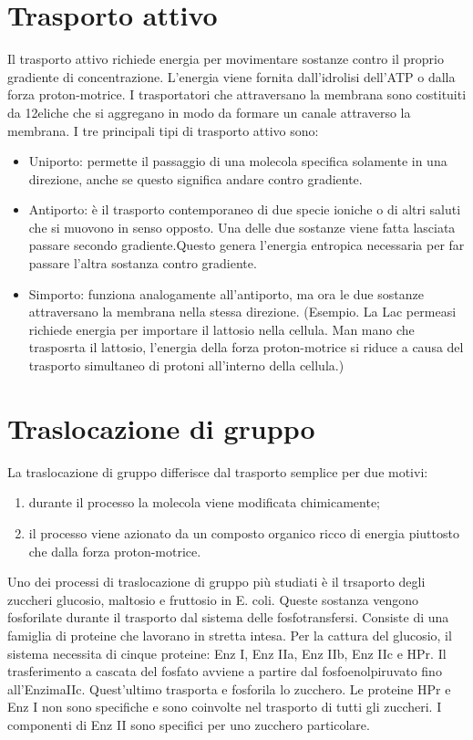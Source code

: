 \section{Trasporto attivo}
Il trasporto attivo richiede energia per movimentare sostanze contro il proprio gradiente di concentrazione. L'energia viene fornita dall'idrolisi dell'ATP o dalla forza proton-motrice.
I trasportatori che attraversano la membrana sono costituiti da 12\alphaA eliche che si aggregano in modo da formare un canale attraverso la membrana. 
I tre principali tipi di trasporto attivo sono: 
\begin{itemize}
        \item Uniporto: permette il passaggio di una molecola specifica solamente in una direzione, anche se questo significa andare contro gradiente. 
        \item Antiporto: è il trasporto contemporaneo di due specie ioniche o di altri saluti che si muovono in senso opposto. Una delle due sostanze viene fatta lasciata passare secondo gradiente.Questo genera l'energia entropica necessaria per far passare l'altra sostanza contro gradiente.
        \item Simporto: funziona analogamente all'antiporto, ma ora le due sostanze attraversano la membrana nella stessa direzione. (Esempio. La Lac permeasi richiede energia per importare il lattosio nella cellula. Man mano che trasposrta il lattosio, l'energia della forza proton-motrice si riduce a causa del trasporto simultaneo di protoni all'interno della cellula.)
\end{itemize}
\section{Traslocazione di gruppo}
La traslocazione di gruppo differisce dal trasporto semplice per due motivi: 
\begin{enumerate}
    \item durante il processo la molecola viene modificata chimicamente;
    \item il processo viene azionato da un composto organico ricco di energia piuttosto che dalla forza proton-motrice.
\end{enumerate}
Uno dei processi di traslocazione di gruppo più studiati \`e il trsaporto degli zuccheri glucosio, maltosio e fruttosio in E. coli. Queste sostanza vengono fosforilate durante il trasporto dal sistema delle fosfotransfersi. Consiste di una famiglia di proteine che lavorano in stretta intesa. Per la cattura del glucosio, il sistema necessita di cinque proteine: Enz I, Enz IIa, Enz IIb, Enz IIc e HPr. Il trasferimento a cascata del fosfato avviene a partire dal fosfoenolpiruvato fino all'EnzimaIIc. Quest'ultimo trasporta e fosforila lo zucchero. Le proteine HPr e Enz I non sono specifiche e sono coinvolte nel trasporto di tutti gli zuccheri. I componenti di Enz II sono specifici per uno zucchero particolare.
